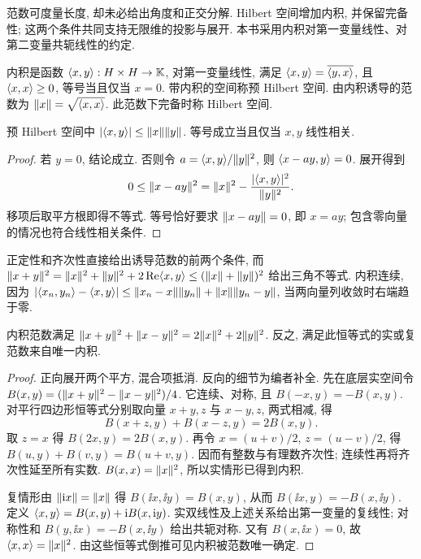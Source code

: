\label{ch:hilbert}
范数可度量长度, 却未必给出角度和正交分解. Hilbert 空间增加内积, 并保留完备性; 这两个条件共同支持无限维的投影与展开. 本书采用内积对第一变量线性、对第二变量共轭线性的约定.

\begin{definition}
内积是函数 $\langle x,y\rangle:H\times H\to\mathbb K$, 对第一变量线性, 满足 $\langle x,y\rangle=\overline{\langle y,x\rangle}$, 且 $\langle x,x\rangle\ge0$, 等号当且仅当 $x=0$. 带内积的空间称预 Hilbert 空间. 由内积诱导的范数为 $\lVert x\rVert=\sqrt{\langle x,x\rangle}$. 此范数下完备时称 Hilbert 空间.
\end{definition}

\begin{theorem}\label{thm:cs}
预 Hilbert 空间中 $|\langle x,y\rangle|\le\lVert x\rVert\lVert y\rVert$. 等号成立当且仅当 $x,y$ 线性相关.
\end{theorem}
\begin{proof}
若 $y=0$, 结论成立. 否则令 $a=\langle x,y\rangle/\lVert y\rVert^2$, 则 $\langle x-ay,y\rangle=0$. 展开得到
\[
0\le\lVert x-ay\rVert^2=\lVert x\rVert^2-\frac{|\langle x,y\rangle|^2}{\lVert y\rVert^2}.
\]
移项后取平方根即得不等式. 等号恰好要求 $\lVert x-ay\rVert=0$, 即 $x=ay$; 包含零向量的情况也符合线性相关条件.
\end{proof}
正定性和齐次性直接给出诱导范数的前两个条件, 而 $\lVert x+y\rVert^2=\lVert x\rVert^2+\lVert y\rVert^2+2\operatorname{Re}\langle x,y\rangle\le(\lVert x\rVert+\lVert y\rVert)^2$ 给出三角不等式. 内积连续, 因为
$|\langle x_n,y_n\rangle-\langle x,y\rangle|\le\lVert x_n-x\rVert\lVert y_n\rVert+\lVert x\rVert\lVert y_n-y\rVert$, 当两向量列收敛时右端趋于零.

\begin{proposition}[平行四边形恒等式]\label{prop:parallelogram}
内积范数满足 $\lVert x+y\rVert^2+\lVert x-y\rVert^2=2\lVert x\rVert^2+2\lVert y\rVert^2$. 反之, 满足此恒等式的实或复范数来自唯一内积.
\end{proposition}
\begin{proof}
正向展开两个平方, 混合项抵消. 反向的细节为编者补全. 先在底层实空间令 $B(x,y)=(\lVert x+y\rVert^2-\lVert x-y\rVert^2)/4$. 它连续、对称, 且 $B(-x,y)=-B(x,y)$. 对平行四边形恒等式分别取向量 $x+y,z$ 与 $x-y,z$, 两式相减, 得
\[
B(x+z,y)+B(x-z,y)=2B(x,y).
\]
取 $z=x$ 得 $B(2x,y)=2B(x,y)$. 再令 $x=(u+v)/2$, $z=(u-v)/2$, 得 $B(u,y)+B(v,y)=B(u+v,y)$. 因而有整数与有理数齐次性; 连续性再将齐次性延至所有实数. $B(x,x)=\lVert x\rVert^2$, 所以实情形已得到内积.

复情形由 $\lVert \mathrm i x\rVert=\lVert x\rVert$ 得 $B(\ii x,\ii y)=B(x,y)$, 从而 $B(\ii x,y)=-B(x,\ii y)$. 定义 $\langle x,y\rangle=B(x,y)+\mathrm i B(x,\mathrm i y)$. 实双线性及上述关系给出第一变量的复线性; 对称性和 $B(y,\ii x)=-B(x,\ii y)$ 给出共轭对称. 又有 $B(x,\ii x)=0$, 故 $\langle x,x\rangle=\lVert x\rVert^2$. 由这些恒等式倒推可见内积被范数唯一确定.
\end{proof}

